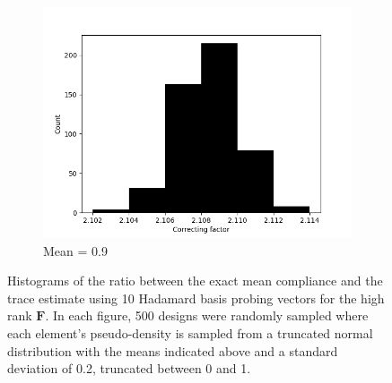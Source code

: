 \begin{figure}
\begin{subfigure}[t]{0.45\textwidth}
        \includegraphics[width=1\textwidth]{./images/robust_approx/results_2d_high_rank_figures/correcting_factors_hadamard_mean_10_09.png}
        \caption{Mean = 0.9}
      \end{subfigure}
      \caption{Histograms of the ratio between the exact mean compliance and the trace estimate using 10 Hadamard basis probing vectors for the high rank $\bm{F}$. In each figure, 500 designs were randomly sampled where each element's pseudo-density is sampled from a truncated normal distribution with the means indicated above and a standard deviation of 0.2, truncated between 0 and 1.}
      \label{fig:correcting_mean_high_rank}
    \end{figure}
